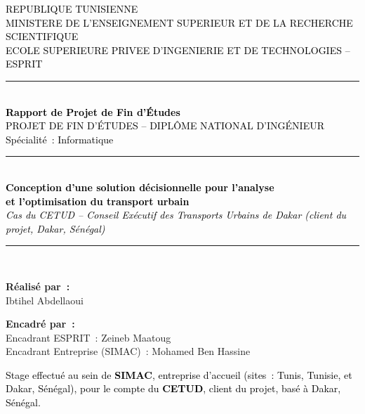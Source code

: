 \begin{titlepage}
\centering
\thispagestyle{empty}

{\small\textcolor{black}{REPUBLIQUE TUNISIENNE \\ MINISTERE DE L'ENSEIGNEMENT SUPERIEUR ET DE LA RECHERCHE SCIENTIFIQUE \\ ECOLE SUPERIEURE PRIVEE D'INGENIERIE ET DE TECHNOLOGIES -- ESPRIT}}\\[0.25cm]
\rule{\linewidth}{0.4pt}\\[0.6cm]

{\Large\bfseries\textcolor{black}{Rapport de Projet de Fin d'\'Etudes}}\\[0.15cm]
{\normalsize\textcolor{black}{PROJET DE FIN D'\'ETUDES -- DIPL\^OME NATIONAL D'ING\'ENIEUR}}\\[0.15cm]
{\normalsize\textcolor{black}{Sp\'ecialit\'e~: Informatique}}\\[0.6cm]

\rule{\linewidth}{1pt}\\[0.3cm]
{\Large\bfseries\textcolor{black}{Conception d'une solution d\'ecisionnelle pour l'analyse}}\\[0.15cm]
{\Large\bfseries\textcolor{black}{et l'optimisation du transport urbain}}\\[0.25cm]
{\normalsize\textit{\textcolor{black}{Cas du CETUD -- Conseil Ex\'ecutif des Transports Urbains de Dakar (client du projet, Dakar, S\'en\'egal)}}}\\[0.3cm]
\rule{\linewidth}{1pt}\\[0.7cm]

\begin{minipage}{0.45\textwidth}
\raggedright
\textbf{R\'ealis\'e par~:}\\
Ibtihel Abdellaoui
\end{minipage}
\begin{minipage}{0.45\textwidth}
\raggedleft
\textbf{Encadr\'e par~:}\\
Encadrant ESPRIT~: Zeineb Maatoug\\
Encadrant Entreprise (SIMAC)~: Mohamed Ben Hassine
\end{minipage}

\vspace{0.5cm}

{\small\textcolor{black}{Stage effectu\'e au sein de \textbf{SIMAC}, entreprise d'accueil (sites~: Tunis, Tunisie, et Dakar, S\'en\'egal), pour le compte du \textbf{CETUD}, client du projet, bas\'e \`a Dakar, S\'en\'egal.}}

\vfill


\end{titlepage}
